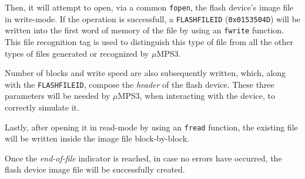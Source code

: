 \documentclass[12pt,a4paper,openright,twoside]{report}
\begin{document}
Then, it will attempt to open, via a common \texttt{fopen}, the flash device's image file in write-mode.
If the operation is successfull, a \texttt{FLASHFILEID} (\texttt{0x0153504D}) will be written into the first word of memory of the file by using an \texttt{fwrite} function.
This file recognition tag is used to distinguish this type of file from all the other types of files generated or recognized by $\mu$MPS3.

Number of blocks and write speed are also subsequently written, which, along with the \texttt{FLASHFILEID}, compose the \textit{header} of the flash device.
These three parameters will be needed by $\mu$MPS3, when interacting with the device, to correctly simulate it.

Lastly, after opening it in read-mode by using an \texttt{fread} function, the existing file will be written inside the image file block-by-block.

Once the \textit{end-of-file} indicator is reached, in case no errors have occurred, the flash device image file will be successfully created.
\end{document}
